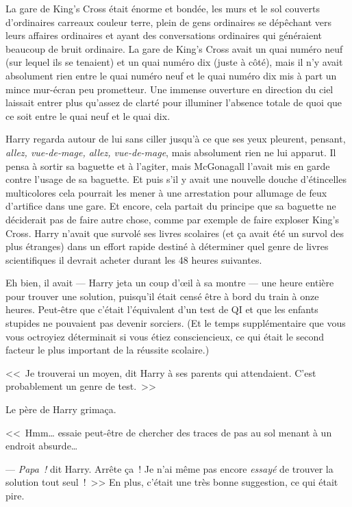 La gare de King's Cross était énorme et bondée, les murs et le sol couverts d'ordinaires carreaux couleur terre, plein de gens ordinaires se dépêchant vers leurs affaires ordinaires et ayant des conversations ordinaires qui généraient beaucoup de bruit ordinaire. La gare de King's Cross avait un quai numéro neuf (sur lequel ils se tenaient) et un quai numéro dix (juste à côté), mais il n'y avait absolument rien entre le quai numéro neuf et le quai numéro dix mis à part un mince mur-écran peu prometteur. Une immense ouverture en direction du ciel laissait entrer plus qu'assez de clarté pour illuminer l'absence totale de quoi que ce soit entre le quai neuf et le quai dix.

Harry regarda autour de lui sans ciller jusqu'à ce que ses yeux pleurent, pensant, \emph{allez, vue-de-mage, allez, vue-de-mage}, mais absolument rien ne lui apparut. Il pensa à sortir sa baguette et à l'agiter, mais McGonagall l'avait mis en garde contre l'usage de sa baguette. Et puis s'il y avait une nouvelle douche d'étincelles multicolores cela pourrait les mener à une arrestation pour allumage de feux d'artifice dans une gare. Et encore, cela partait du principe que sa baguette ne déciderait pas de faire autre chose, comme par exemple de faire exploser King's Cross. Harry n'avait que survolé ses livres scolaires (et ça avait été un survol des plus étranges) dans un effort rapide destiné à déterminer quel genre de livres scientifiques il devrait acheter durant les 48 heures suivantes.

Eh bien, il avait — Harry jeta un coup d'œil à sa montre — une heure entière pour trouver une solution, puisqu'il était censé être à bord du train à onze heures. Peut-être que c'était l'équivalent d'un test de QI et que les enfants stupides ne pouvaient pas devenir sorciers. (Et le temps supplémentaire que vous vous octroyiez déterminait si vous étiez consciencieux, ce qui était le second facteur le plus important de la réussite scolaire.)

<<~Je trouverai un moyen, dit Harry à ses parents qui attendaient. C'est probablement un genre de test.~>>

Le père de Harry grimaça.

<<~Hmm… essaie peut-être de chercher des traces de pas au sol menant à un endroit absurde…

--- \emph{Papa~!} dit Harry. Arrête ça~! Je n'ai même pas encore \emph{essayé} de trouver la solution tout seul~!~>> En plus, c'était une très bonne suggestion, ce qui était pire.

